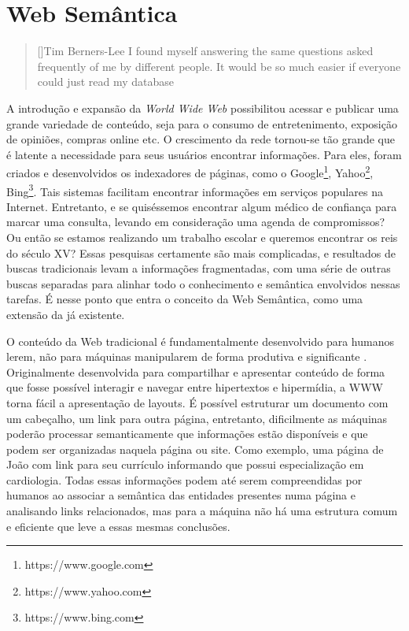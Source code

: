 \chapter{Web Semântica}

\begin{quotation}[]{Tim Berners-Lee}
I found myself answering the same questions asked frequently of me by different people. It would be so much easier if everyone could just read my database
\end{quotation}

A introdução e expansão da \textit{World Wide Web} possibilitou acessar e publicar uma grande variedade de conteúdo, seja para o consumo de entretenimento, exposição de opiniões, compras online etc. O crescimento da rede tornou-se tão grande que é latente a necessidade para seus usuários encontrar informações. Para eles, foram criados e desenvolvidos os indexadores de páginas, como o Google\footnote{https://www.google.com}, Yahoo\footnote{https://www.yahoo.com}, Bing\footnote{https://www.bing.com}. Tais sistemas facilitam encontrar informações em serviços populares na Internet. Entretanto, e se quiséssemos encontrar algum médico de confiança para marcar uma consulta, levando em consideração uma agenda de compromissos? Ou então se estamos realizando um trabalho escolar e queremos encontrar os reis do século XV? Essas pesquisas certamente são mais complicadas, e resultados de buscas tradicionais levam a informações fragmentadas, com uma série de outras buscas separadas para alinhar todo o conhecimento e semântica envolvidos nessas tarefas. É nesse ponto que entra o conceito da Web Semântica, como uma extensão da já existente.

O conteúdo da Web tradicional é fundamentalmente desenvolvido para humanos lerem, não para máquinas manipularem de forma produtiva e significante \citep{bernerslee2001semantic}. Originalmente desenvolvida para compartilhar e apresentar conteúdo de forma que fosse possível interagir e navegar entre hipertextos e hipermídia, a \ac{WWW} torna fácil a apresentação de layouts. É possível estruturar um documento com um cabeçalho, um link para outra página, entretanto, dificilmente as máquinas poderão processar semanticamente que informações estão disponíveis e que podem ser organizadas naquela página ou site. Como exemplo, uma página de João com link para seu currículo informando que possui especialização em cardiologia. Todas essas informações podem até serem compreendidas por humanos ao associar a semântica das entidades presentes numa página e analisando links relacionados, mas para a máquina não há uma estrutura comum e eficiente que leve a essas mesmas conclusões.

